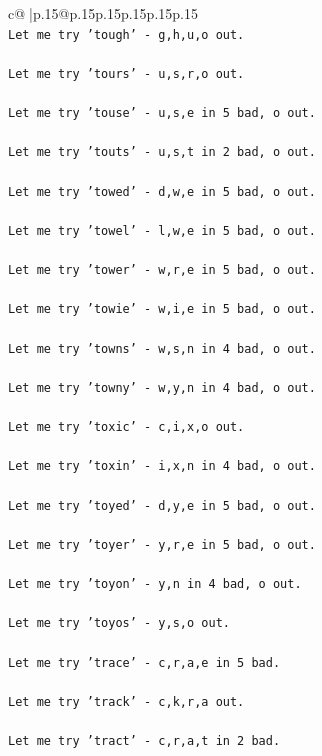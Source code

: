 \documentclass{article}
\begin{document}
{\begin{supertabular}{c@{$\;$}|p{.15\linewidth}@{}p{.15\linewidth}p{.15\linewidth}p{.15\linewidth}p{.15\linewidth}p{.15\linewidth}}
{{{\\ 
\texttt{Let me try 'tough' {-} g,h,u,o out. } \\
\\ 
\texttt{Let me try 'tours' {-} u,s,r,o out. } \\
\\ 
\texttt{Let me try 'touse' {-} u,s,e in 5 bad, o out. } \\
\\ 
\texttt{Let me try 'touts' {-} u,s,t in 2 bad, o out. } \\
\\ 
\texttt{Let me try 'towed' {-} d,w,e in 5 bad, o out. } \\
\\ 
\texttt{Let me try 'towel' {-} l,w,e in 5 bad, o out. } \\
\\ 
\texttt{Let me try 'tower' {-} w,r,e in 5 bad, o out. } \\
\\ 
\texttt{Let me try 'towie' {-} w,i,e in 5 bad, o out. } \\
\\ 
\texttt{Let me try 'towns' {-} w,s,n in 4 bad, o out. } \\
\\ 
\texttt{Let me try 'towny' {-} w,y,n in 4 bad, o out. } \\
\\ 
\texttt{Let me try 'toxic' {-} c,i,x,o out. } \\
\\ 
\texttt{Let me try 'toxin' {-} i,x,n in 4 bad, o out. } \\
\\ 
\texttt{Let me try 'toyed' {-} d,y,e in 5 bad, o out. } \\
\\ 
\texttt{Let me try 'toyer' {-} y,r,e in 5 bad, o out. } \\
\\ 
\texttt{Let me try 'toyon' {-} y,n in 4 bad, o out. } \\
\\ 
\texttt{Let me try 'toyos' {-} y,s,o out. } \\
\\ 
\texttt{Let me try 'trace' {-} c,r,a,e in 5 bad. } \\
\\ 
\texttt{Let me try 'track' {-} c,k,r,a out. } \\
\\ 
\texttt{Let me try 'tract' {-} c,r,a,t in 2 bad. } \\
}}}
\end{supertabular}}
\end{document}

